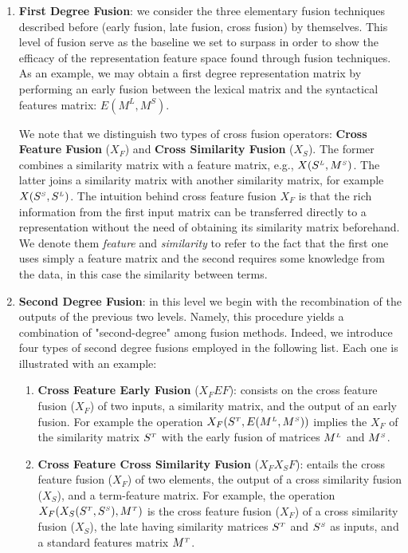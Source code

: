  \begin{enumerate}
\item \textbf{First Degree Fusion}: we  consider the  three elementary fusion techniques described before (early fusion, late fusion, cross fusion) by themselves.  This level of fusion serve as the baseline we set to surpass in order to show the efficacy of the representation feature space found through fusion techniques.
As an example, we may obtain a first degree representation matrix by performing an early fusion between the lexical matrix and the syntactical features matrix: $E(M^{L}, M^{S})$. 

We note that we distinguish two types of cross fusion operators: \textbf{Cross Feature Fusion} ($X_F$) and \textbf{Cross Similarity Fusion} ($X_S$). The former combines a similarity matrix with a feature matrix, e.g., $X(S^{\scriptscriptstyle L}, M^{\scriptscriptstyle S})$. The latter joins a similarity matrix with another similarity matrix, for example $X(S^{\scriptscriptstyle S}, S^{\scriptscriptstyle L})$. %
The intuition behind cross feature fusion $X_F$ is that the rich information from the first input matrix can be transferred directly to a representation without the need of obtaining its similarity matrix beforehand. We denote them \textit{feature} and \textit{similarity} to refer to the fact that the first one uses simply a feature matrix and the second requires some knowledge from the data, in this case the similarity between terms.

\item \textbf{Second Degree Fusion}: in this level we  begin with the recombination of the outputs of the previous two levels. Namely, this procedure  yields a combination of "second-degree" among fusion methods. Indeed, we introduce four types of second degree fusions employed in the following list. Each one is illustrated with an example:


\begin{enumerate}

\item \textbf{Cross Feature Early Fusion} ($X_FEF$): consists on the cross feature fusion ($X_F$) of two inputs, a similarity matrix, and the output of an early fusion. For example the operation $X_F(S^{\scriptscriptstyle T}, E(M^{\scriptscriptstyle L}, M^{\scriptscriptstyle S}))$ implies the $X_F$ of the similarity matrix $S^{\scriptscriptstyle T}$ with the early fusion of matrices $M^{\scriptscriptstyle L}$ and $M^{\scriptscriptstyle S}$.

\item \textbf{Cross Feature Cross Similarity Fusion} ($X_FX_SF$): entails the cross feature fusion ($X_F$) of two elements, the output of a cross similarity fusion ($X_S$), and a term-feature matrix. For example, the operation $X_F(X_S(S^{\scriptscriptstyle T}, S^{\scriptscriptstyle S}), M^{\scriptscriptstyle T})$ is the cross feature fusion ($X_F$) of a cross similarity fusion ($X_S$), the late having similarity matrices $S^{\scriptscriptstyle T}$ and $S^{\scriptscriptstyle S}$ as inputs, and a standard features matrix $M^{\scriptscriptstyle T}$.


\end{enumerate}
\end{enumerate}
